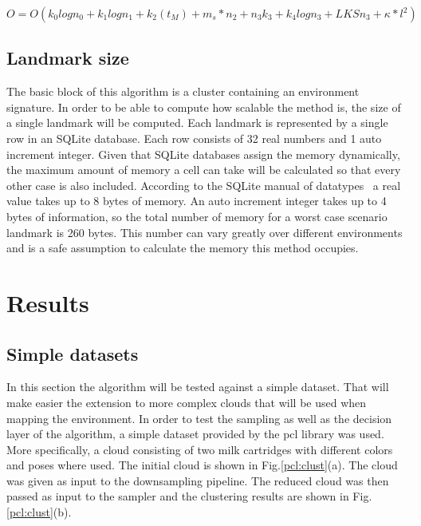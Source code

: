 \documentclass[]{article}
\begin{document}
    \begin{equation} \label{Complexity}
        O= O(k_{0}logn_{0} + k_{1}logn_{1} + k_{2}(t_M)+ m_s*n_{2} + n_{3}k_{3} + k_{4}logn_{3} + LKSn_3 + \kappa * l^2)
    \end{equation}





    \subsection{Landmark size}

    The basic block of this algorithm is a cluster containing an environment signature. In order to be able to compute how scalable the method is, the size of a single landmark will be computed. Each landmark is represented by a single row in an SQLite database. Each row consists of 32 real numbers and 1 auto increment integer. Given that SQLite databases assign the memory dynamically, the maximum amount of memory a cell can take will be calculated so that every other case is also included. According to the SQLite manual of datatypes~\cite{sqlite} a real value takes up to 8 bytes of memory. An auto increment integer takes up to 4 bytes of information, so the total number  of memory for a worst case scenario landmark is 260 bytes. This number can vary greatly over different environments and is a safe assumption to calculate the memory this method occupies.

    \section{Results}
    \label{sec:results}

    \subsection{Simple datasets}

    In this section the algorithm will be tested against a simple dataset. That will make easier the extension to more complex clouds that will be used when mapping the environment. In order to test the sampling as well as the decision layer of the algorithm, a simple dataset provided by the pcl\cite{pcl} library was used. More specifically, a cloud consisting of two milk cartridges with different colors and poses where used. The initial cloud is shown in Fig.\ref{pcl:clust}(a). The cloud was given as input to the downsampling pipeline. The reduced cloud was then passed as input to the sampler and the clustering results are shown in Fig.\ref{pcl:clust}(b).
\end{document}

